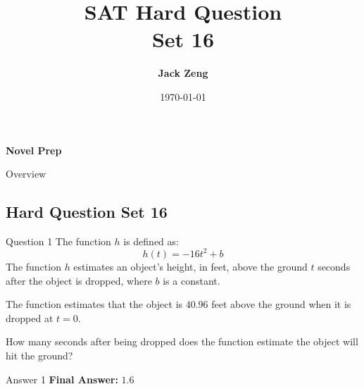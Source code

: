 \documentclass{beamer}
\title[SAT Hard Question 16]{\textbf{SAT Hard Question\\ Set 16}}
\author{\textbf{Jack Zeng}}
\institute{\textcolor{white}{\textbf{Novel Prep}}}
\date{\today}
\begin{document}
\begin{frame}
    \titlepage
    \vfill
    \begin{flushright}
        \textcolor{purpleblue}{\Huge \textbf{Novel Prep}}
    \end{flushright}
\end{frame}

\begin{frame}
\end{frame}

\begin{frame}{Overview}
    \tableofcontents
\end{frame}

\begin{frame}
\section{Hard Question Set 16}
\end{frame}

\begin{frame}{Question 1}
\small
The function \(h\) is defined as:
\[
h(t) = -16t^2 + b
\]
The function \(h\) estimates an object's height, in feet, above the ground \(t\) seconds after the object is dropped, where \(b\) is a constant.

The function estimates that the object is \(40.96\) feet above the ground when it is dropped at \(t = 0\).

How many seconds after being dropped does the function estimate the object will hit the ground?
\end{frame}
\begin{frame}{Answer 1}
\small
\textbf{Final Answer:} $\boxed{1.6}$
\end{frame}
\end{document}
